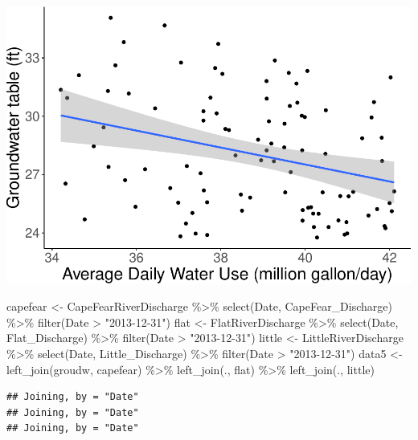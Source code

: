 \documentclass[
  12pt,
]{article}
\newenvironment{Shaded}{\begin{snugshade}}{\end{snugshade}}
\newcommand{\FunctionTok}[1]{\textcolor[rgb]{0.00,0.00,0.00}{#1}}
\newcommand{\NormalTok}[1]{#1}
\newcommand{\OtherTok}[1]{\textcolor[rgb]{0.56,0.35,0.01}{#1}}
\newcommand{\SpecialCharTok}[1]{\textcolor[rgb]{0.00,0.00,0.00}{#1}}
\newcommand{\StringTok}[1]{\textcolor[rgb]{0.31,0.60,0.02}{#1}}
\begin{document}
\includegraphics{Project_files/figure-latex/groundwater and withdraws-2.pdf}

\begin{Shaded}
\begin{Highlighting}[]
\NormalTok{capefear }\OtherTok{\textless{}{-}}\NormalTok{ CapeFearRiverDischarge }\SpecialCharTok{\%\textgreater{}\%}
  \FunctionTok{select}\NormalTok{(Date, CapeFear\_Discharge) }\SpecialCharTok{\%\textgreater{}\%}
  \FunctionTok{filter}\NormalTok{(Date }\SpecialCharTok{\textgreater{}} \StringTok{"2013{-}12{-}31"}\NormalTok{)}
\NormalTok{flat }\OtherTok{\textless{}{-}}\NormalTok{ FlatRiverDischarge }\SpecialCharTok{\%\textgreater{}\%}
  \FunctionTok{select}\NormalTok{(Date, Flat\_Discharge) }\SpecialCharTok{\%\textgreater{}\%}
  \FunctionTok{filter}\NormalTok{(Date }\SpecialCharTok{\textgreater{}} \StringTok{"2013{-}12{-}31"}\NormalTok{)}
\NormalTok{little }\OtherTok{\textless{}{-}}\NormalTok{ LittleRiverDischarge }\SpecialCharTok{\%\textgreater{}\%}
  \FunctionTok{select}\NormalTok{(Date, Little\_Discharge) }\SpecialCharTok{\%\textgreater{}\%}
  \FunctionTok{filter}\NormalTok{(Date }\SpecialCharTok{\textgreater{}} \StringTok{"2013{-}12{-}31"}\NormalTok{)}
\NormalTok{data5 }\OtherTok{\textless{}{-}} \FunctionTok{left\_join}\NormalTok{(groudw, capefear) }\SpecialCharTok{\%\textgreater{}\%}
  \FunctionTok{left\_join}\NormalTok{(., flat) }\SpecialCharTok{\%\textgreater{}\%}
  \FunctionTok{left\_join}\NormalTok{(., little) }
\end{Highlighting}
\end{Shaded}

\begin{verbatim}
## Joining, by = "Date"
## Joining, by = "Date"
## Joining, by = "Date"
\end{verbatim}
\end{document}
